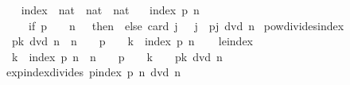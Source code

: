 \begin{isabellebody}
%
\isadelimproof
\ \ %
\endisadelimproof
%
\isatagproof
{}\isamarkupfalse%
%
\endisatagproof
{\isafoldproof}%
%
\isadelimproof
\isanewline
%
\endisadelimproof
\isanewline
{}\isamarkupfalse%
\ index\ {\isacharcolon}{\kern0pt}{\isacharcolon}{\kern0pt}\ {\isachardoublequoteopen}nat\ {\isasymRightarrow}\ nat\ {\isasymRightarrow}\ nat{\isachardoublequoteclose}\ \isanewline
\ \ {\isachardoublequoteopen}index\ p\ n\ \isanewline
\ \ \ \ {\isasymequiv}\ if\ p\ {\isasymle}\ {}\ {\isasymor}\ n\ {\isacharequal}{\kern0pt}\ {}\ then\ {}\ else\ card\ {\isacharbraceleft}{\kern0pt}j{\isachardot}{\kern0pt}\ {}\ {\isasymle}\ j\ {\isasymand}\ p{\isacharcircum}{\kern0pt}j\ dvd\ n{\isacharbraceright}{\kern0pt}{\isachardoublequoteclose}\isanewline
\isanewline
{}\isamarkupfalse%
\ pow{\isacharunderscore}{\kern0pt}divides{\isacharunderscore}{\kern0pt}index{\isacharcolon}{\kern0pt}\isanewline
\ \ {\isachardoublequoteopen}p{\isacharcircum}{\kern0pt}k\ dvd\ n\ {\isasymlongleftrightarrow}\ n\ {\isacharequal}{\kern0pt}\ {}\ {\isasymor}\ p\ {\isacharequal}{\kern0pt}\ {}\ {\isasymor}\ k\ {\isasymle}\ index\ p\ n{\isachardoublequoteclose}\isanewline
%
\isadelimproof
\ \ %
\endisadelimproof
%
\isatagproof
{}\isamarkupfalse%
%
\endisatagproof
{\isafoldproof}%
%
\isadelimproof
\isanewline
%
\endisadelimproof
\isanewline
{}\isamarkupfalse%
\ le{\isacharunderscore}{\kern0pt}index{\isacharcolon}{\kern0pt}\isanewline
\ \ {\isachardoublequoteopen}k\ {\isasymle}\ index\ p\ n\ {\isasymlongleftrightarrow}\ {\isacharparenleft}{\kern0pt}n\ {\isacharequal}{\kern0pt}\ {}\ {\isasymor}\ p\ {\isacharequal}{\kern0pt}\ {}\ {\isasymlongrightarrow}\ k\ {\isacharequal}{\kern0pt}\ {}{\isacharparenright}{\kern0pt}\ {\isasymand}\ p{\isacharcircum}{\kern0pt}k\ dvd\ n{\isachardoublequoteclose}\isanewline
%
\isadelimproof
\ \ %
\endisadelimproof
%
\isatagproof
{}\isamarkupfalse%
%
\endisatagproof
{\isafoldproof}%
%
\isadelimproof
\isanewline
%
\endisadelimproof
\isanewline
{}\isamarkupfalse%
\ exp{\isacharunderscore}{\kern0pt}index{\isacharunderscore}{\kern0pt}divides{\isacharcolon}{\kern0pt}\ {\isachardoublequoteopen}p{\isacharcircum}{\kern0pt}{\isacharparenleft}{\kern0pt}index\ p\ n{\isacharparenright}{\kern0pt}\ dvd\ n{\isachardoublequoteclose}\isanewline
%
\isadelimproof
\ \ %
\endisadelimproof
%
\isatagproof
{}\isamarkupfalse%

\end{isabellebody}
